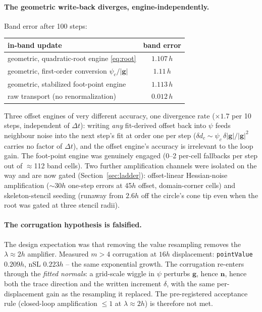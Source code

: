 \documentclass[preprint,3p,11pt]{elsarticle}
\newcommand{\psilev}{\psi}
\newcommand{\nv}{\mathbf{n}}
\newcommand{\gv}{\mathbf{g}}
\begin{document}
\paragraph{The geometric write-back diverges, engine-independently.} Band
error after 100 steps:
\begin{center}\small
\begin{tabular}{lc}
\toprule
in-band update & band error \\
\midrule
geometric, quadratic-root engine \eqref{eq:root} & $1.107\,h$ \\
geometric, first-order conversion $\psilev_c/\lvert\gv\rvert$ & $1.11\,h$ \\
geometric, stabilized foot-point engine & $1.113\,h$ \\
raw transport (no renormalization) & $0.012\,h$ \\
\bottomrule
\end{tabular}
\end{center}
Three offset engines of very different accuracy, one divergence rate
($\times1.7$ per 10 steps, independent of $\Delta t$): writing \emph{any}
fit-derived offset back into $\psilev$ feeds neighbour noise into the next
step's fit at order one per step
($\delta d_c\sim\psilev_c\,\delta\lvert\gv\rvert/\lvert\gv\rvert^{2}$ carries
no factor of $\Delta t$), and the offset engine's accuracy is irrelevant to
the loop gain. The foot-point engine was genuinely engaged (0--2 per-cell
fallbacks per step out of $\approx$112 band cells). Two further amplification
channels were isolated on the way and are now gated
(Section~\ref{sec:ladder}): offset-linear Hessian-noise amplification
($\sim$30$h$ one-step errors at 45$h$ offset, domain-corner cells) and
skeleton-stencil seeding (runaway from $2.6h$ off the circle's cone tip even
when the root was gated at three stencil radii).

\paragraph{The corrugation hypothesis is falsified.} The design expectation
was that removing the value resampling removes the $\lambda\approx2h$
amplifier. Measured $m>4$ corrugation at $16h$ displacement:
\texttt{pointValue} $0.209h$, nSL $0.223h$ -- the same exponential growth.
The corrugation re-enters through the \emph{fitted normals}: a grid-scale
wiggle in $\psilev$ perturbs $\gv$, hence $\nv$, hence both the trace
direction and the written increment $\delta$, with the same per-displacement
gain as the resampling it replaced. The pre-registered acceptance rule
(closed-loop amplification $\le1$ at $\lambda\approx2h$) is therefore not
met.
\end{document}
